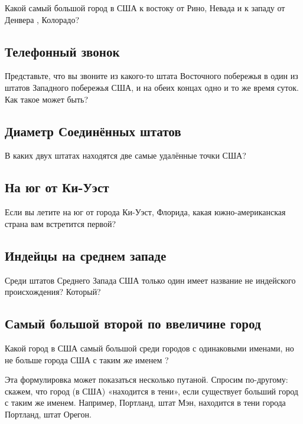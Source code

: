 Какой самый большой город в США к востоку от Рино, Невада  и к западу от Денвера , Колорадо?


\subsection*{Телефонный звонок}%


Представьте, что вы звоните из какого-то штата Восточного побережья в один из штатов Западного побережья США, и на обеих концах одно и то же время суток. Как такое может быть?  
 


\subsection*{Диаметр Соединённых штатов}%


В каких двух штатах находятся две самые удалённые точки США?  
       


\subsection*{На юг от Ки-Уэст}%


Если вы летите на юг от города Ки-Уэст, Флорида, какая южно-американская страна вам 
встретится первой?     

\subsection*{Индейцы на среднем западе}%


Среди  штатов Среднего Запада США только один имеет название не индейского происхождения?  Который?    




\subsection*{Самый большой второй по ввеличине город}%


Какой город  в США самый большой среди городов с одинаковыми именами, но  не больше города США с таким же именем ?


Эта формулировка может показаться несколько путаной. Спросим по-другому: скажем, что город (в США) «находится в тени», если существует больший город с таким же именем. Например,
Портланд, штат Мэн,  находится в тени города Портланд, штат Орегон.



